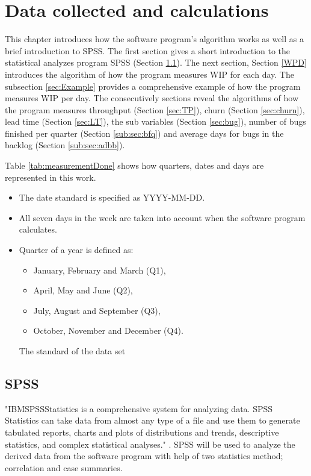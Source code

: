\documentclass[UKenglish]{ifimaster}  %
\begin{document}
\chapter{Data collected and calculations}
\label{ch:DCC}
This chapter introduces how the software program's algorithm works as well as a brief introduction to SPSS.  The first section gives a short introduction to the statistical analyzes program SPSS  (Section \ref{sec:SPSS}). The next section, Section \ref{WPD} introduces the algorithm of how the program measures WIP for each day. The subsection \ref{sec:Example} provides a comprehensive example of how the program measures WIP per day. The consecutively sections reveal the algorithms of how the program measures  throughput (Section \ref{sec:TP}),  churn (Section \ref{sec:churn}),  lead time (Section \ref{sec:LT}), the sub variables (Section \ref{sec:bug}), number of bugs finished per quarter (Section  \ref{sub:sec:bfq}) and average days for bugs in the backlog (Section \ref{sub:sec:adbb}). 

Table \ref{tab:measurementDone} shows how quarters, dates and days are represented in this work. 

\begin{table}[!ht]
\centering
\begin{itemize}
\item The date standard is specified as YYYY-MM-DD.
\item All seven days in the week are taken into account when the software program calculates.
\item Quarter of a year is defined as: 
\begin{itemize}
\item January, February and March (Q1),
\item April, May and June (Q2),
\item July, August and September (Q3),
\item October, November and December (Q4).
\end{itemize}
\parencite{Quarter}
\caption{The standard of the data set}
\label{tab:measurementDone}
\end{itemize}
\end{table}



\section{SPSS}
\label{sec:SPSS}
"IBM\circledR  SPSS\circledR Statistics is a comprehensive system for analyzing data. SPSS Statistics can take data from almost any type of a file and use them to generate tabulated reports, charts and plots of distributions and trends, descriptive statistics, and complex statistical analyses." \parencite{IBM}. SPSS will be used to analyze the derived data from the software program with help of two statistics method; correlation and case summaries. 
\end{document}
